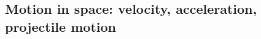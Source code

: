 \documentclass[10pt]{article}
\theoremstyle{definition}
\newtheorem{problem}[theorem]{Problem}
\newcommand{\1}[1]{\textbf{1}_{\left[#1\right]}} %
\begin{document}





  


\subsection{Motion in space: velocity, acceleration, projectile motion}
\end{document}

